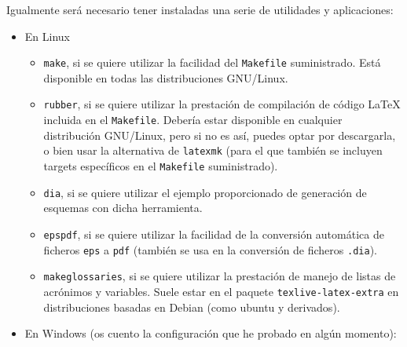 \documentclass[spanish,openright]{book}
\begin{document}
Igualmente será necesario tener instaladas una serie de utilidades y
aplicaciones:

\begin{itemize}
\item En Linux

  \begin{itemize}
  \item \texttt{make}, si se quiere utilizar la facilidad del
    \texttt{Makefile} suministrado. Está disponible en todas las
    distribuciones GNU/Linux.
  \item \texttt{rubber}, si se quiere utilizar la prestación de
    compilación de código \LaTeX{} incluida en el
    \texttt{Makefile}. Debería estar disponible en cualquier distribución
    GNU/Linux, pero si no es así, puedes optar por descargarla, o bien
    usar la alternativa de \texttt{latexmk} (para el que también se
    incluyen targets específicos en el \texttt{Makefile} suministrado).
  \item \texttt{dia}, si se quiere utilizar el ejemplo proporcionado de
    generación de esquemas con dicha herramienta.
  \item \texttt{epspdf}, si se quiere utilizar la facilidad de la
    conversión automática de ficheros \texttt{eps} a \texttt{pdf} (también
    se usa en la conversión de ficheros \texttt{.dia}).
  \item \texttt{makeglossaries}, si se quiere utilizar la prestación de
    manejo de listas de acrónimos y variables. Suele estar en el paquete
    \texttt{texlive-latex-extra} en distribuciones basadas en Debian
    (como ubuntu y derivados).
\end{itemize}

\item En Windows (os cuento la configuración que he probado en algún momento):


\end{itemize}
\end{document}
